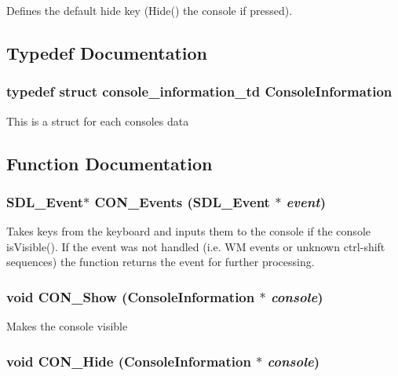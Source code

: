 Defines the default hide key (Hide() the console if pressed).



\subsection{Typedef Documentation}
\subsubsection{\setlength{\rightskip}{0pt plus 5cm}typedef struct {\bf console\_\-information\_\-td}
	 Console\-Information}\label{CON__console_8h_a9}


This is a struct for each consoles data 

\subsection{Function Documentation}
\subsubsection{\setlength{\rightskip}{0pt plus 5cm}SDL\_\-Event$\ast$ CON\_\-Events (SDL\_\-Event $\ast$ {\em event})}\label{CON__console_8h_a10}


Takes keys from the keyboard and inputs them to the console if the console is\-Visible(). If the event was not handled (i.e. WM events or unknown ctrl-shift  sequences) the function returns the event for further processing. 
\subsubsection{\setlength{\rightskip}{0pt plus 5cm}void CON\_\-Show ({\bf Console\-Information} $\ast$ {\em console})}\label{CON__console_8h_a11}


Makes the console visible 
\subsubsection{\setlength{\rightskip}{0pt plus 5cm}void CON\_\-Hide ({\bf Console\-Information} $\ast$ {\em console})}\label{CON__console_8h_a12}


